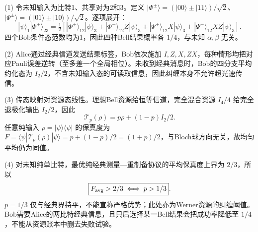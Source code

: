 (1) 令未知输入为比特1、共享对为2和3。定义 \(|\Phi^\pm\rangle=(|00\rangle\pm|11\rangle)/\sqrt2\)、\(|\Psi^\pm\rangle=(|01\rangle\pm|10\rangle)/\sqrt2\)。逐项展开：
\[
|\psi\rangle_1|\Phi^+\rangle_{23}=\tfrac12[
|\Phi^+\rangle_{12}|\psi\rangle_3+
|\Phi^-\rangle_{12}Z|\psi\rangle_3+
|\Psi^+\rangle_{12}X|\psi\rangle_3+
|\Psi^-\rangle_{12}XZ|\psi\rangle_3].
\]
四个Bob条件态范数均为1，因此四种Bell结果概率各 \(1/4\)，与未知 \(\alpha,\beta\) 无关。

(2) Alice通过经典信道发送结果标签，Bob依次施加 \(I,Z,X,ZX\)，每种情形均把对应Pauli误差逆转（至多差一个全局相位）。未收到经典消息时，Bob的四分支平均约化态为 \(I_2/2\)，不含未知输入态的可读取信息，因此纠缠本身不允许超光速传信。

(3) 传态映射对资源态线性。理想Bell资源给恒等信道，完全混合资源 \(I_4/4\) 给完全退极化输出 \(I_2/2\)，因此
\[
\boxed{\mathcal T_p(\rho)=p\rho+(1-p)I_2/2}.
\]
任意纯输入 \(\rho=|\psi\rangle\langle\psi|\) 的保真度为
\(F=\langle\psi|\mathcal T_p(\rho)|\psi\rangle=p+(1-p)/2=(1+p)/2\)，与Bloch球方向无关，故均匀平均仍为同值。

(4) 对未知纯单比特，最优纯经典测量—重制备协议的平均保真度上界为 \(2/3\)，所以
\[
\boxed{F_{\rm avg}>2/3\iff p>1/3}.
\]
\(p=1/3\) 仅与经典界持平，不能宣称严格优势；此处亦为Werner资源的纠缠阈值。Bob需要Alice的两比特经典信息，且只后选择某一Bell结果会把成功率降低至 \(1/4\)，不能从资源账本中删去失败试验。
